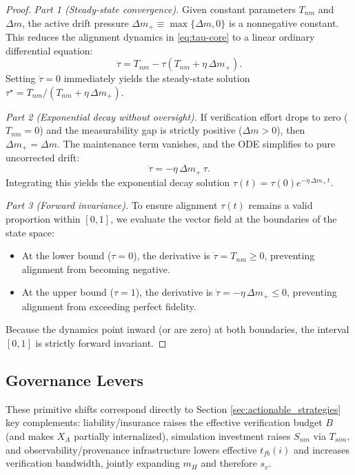 \documentclass[12pt, letter]{article}
\begin{document}
\begin{proof}
\textit{Part 1 (Steady-state convergence).} Given constant parameters $T_{nm}$ and $\Delta m$, the active drift pressure $\Delta m_+ \equiv \max\{\Delta m, 0\}$ is a nonnegative constant. This reduces the alignment dynamics in \eqref{eq:tau-core} to a linear ordinary differential equation:
\[
    \dot{\tau} = T_{nm} - \tau(T_{nm} + \eta\,\Delta m_+).
\]
Setting $\dot{\tau}=0$ immediately yields the steady-state solution $\tau^\star = T_{nm}/(T_{nm}+\eta\,\Delta m_+)$. 

\textit{Part 2 (Exponential decay without oversight).} If verification effort drops to zero ($T_{nm}=0$) and the measurability gap is strictly positive ($\Delta m>0$), then $\Delta m_+ = \Delta m$. The maintenance term vanishes, and the ODE simplifies to pure uncorrected drift:
\[
    \dot{\tau} = -\eta\,\Delta m_+\,\tau.
\]
Integrating this yields the exponential decay solution $\tau(t) = \tau(0)e^{-\eta\,\Delta m_+\,t}$.

\textit{Part 3 (Forward invariance).} To ensure alignment $\tau(t)$ remains a valid proportion within $[0,1]$, we evaluate the vector field at the boundaries of the state space:
\begin{itemize}
    \item At the lower bound ($\tau=0$), the derivative is $\dot{\tau} = T_{nm} \ge 0$, preventing alignment from becoming negative.
    \item At the upper bound ($\tau=1$), the derivative is $\dot{\tau} = -\eta\,\Delta m_+ \le 0$, preventing alignment from exceeding perfect fidelity.
\end{itemize}
Because the dynamics point inward (or are zero) at both boundaries, the interval $[0,1]$ is strictly forward invariant.
\end{proof}



\subsection{Governance Levers}\label{subsec:core-governance}

These primitive shifts correspond directly to Section \ref{sec:actionable_strategies} key complements: liability/insurance raises the effective verification budget $B$ (and makes $X_A$ partially internalized), simulation investment raises $S_{nm}$ via $T_{sim}$, and observability/provenance infrastructure lowers effective $t_{fb}(i)$ and increases verification bandwidth, jointly expanding $m_H$ and therefore $s_v$.
\end{document}
